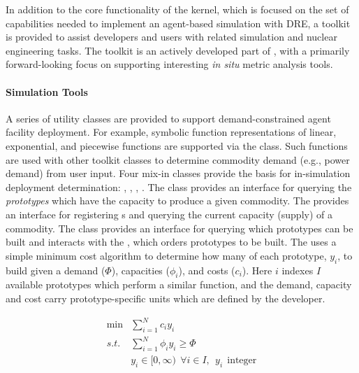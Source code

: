 In addition to the core functionality of the \Cyclus kernel, which is focused on
the set of capabilities needed to implement an agent-based simulation
with \gls{DRE}, a toolkit is provided to assist developers
and users with related simulation and nuclear engineering tasks. The toolkit is
an actively developed part of \Cyclus, with a primarily forward-looking
focus on supporting interesting \textit{in situ} metric analysis tools.

\paragraph{Simulation Tools}

A series of utility classes are provided to support demand-constrained agent
facility deployment. For example, symbolic function representations of linear,
exponential, and piecewise functions are supported via the
 class. Such functions are used with other toolkit
classes to determine commodity demand (e.g., power demand) from user input. Four
mix-in classes provide the basis for in-simulation deployment determination:
, , ,
. The  class provides an
interface for querying the \textit{prototypes} which have the
capacity to produce a given commodity. The 
provides an interface for registering s and querying
the current capacity (supply) of a commodity. The  class provides
an interface for querying which prototypes can be built and interacts with the
, which orders prototypes to be built. The
 uses a simple minimum cost algorithm to determine how
many of each prototype, $y_i$, to build given a demand ($\Phi$), capacities
($\phi_i$), and costs ($c_i$). Here $i$ indexes $I$ available prototypes which perform a similar function, and the demand, capacity and cost carry prototype-specific units which are defined by the developer.

\begin{equation}
\begin{aligned}
 \min & \sum_{i=1}^{N}c_i y_i \\
 s.t. & \sum_{i=1}^{N}\phi_i y_i \ge \Phi \\
      & y_i \in [0,\infty) \:\: \forall i \in I, \:\: y_i \:\: \text{integer}
\end{aligned}
\end{equation}

